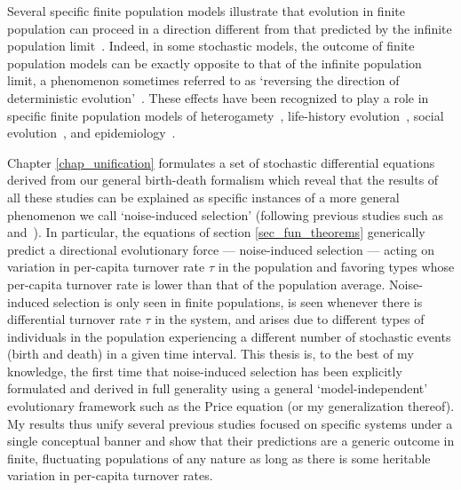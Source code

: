 Several specific finite population models illustrate that evolution in finite population can proceed in a direction different from that predicted by the infinite population limit~\citep{parsons_consequences_2010,melbinger_evolutionary_2010, houchmandzadeh_selection_2012, houchmandzadeh_fluctuation_2015,chotibut_evolutionary_2015,debarre_evolutionary_2016, behar_fluctuations-induced_2016, constable_demographic_2016,veller_drift-induced_2017,abu_awad_effects_2018,parsons_pathogen_2018,mcavoy_public_2018,mcleod_social_2019}. Indeed, in some stochastic models, the outcome of finite population models can be exactly opposite to that of the infinite population limit, a phenomenon sometimes referred to as `reversing the direction of deterministic evolution'~\citep{constable_demographic_2016,mcleod_social_2019, wang_reproductive_2023}. These effects have been recognized to play a role in specific finite population models of heterogamety~\citep{veller_drift-induced_2017,saunders_sex_2018}, life-history evolution~\citep{gillespie_natural_1974,kuosmanen_turnover_2022}, social evolution~\citep{houchmandzadeh_selection_2012,houchmandzadeh_fluctuation_2015,chotibut_evolutionary_2015,constable_demographic_2016,mcleod_social_2019,wang_reproductive_2023}, and epidemiology~\citep{kogan_two-strain_2014,parsons_pathogen_2018,day_price_2020}.

Chapter \ref{chap_unification} formulates a set of stochastic differential equations derived from our general birth-death formalism which reveal that the results of all these studies can be explained as specific instances of a more general phenomenon we call `noise-induced selection' (following previous studies such as~\cite{constable_demographic_2016} and~\cite{week_white_2021}). In particular, the equations of section \ref{sec_fun_theorems} generically predict a directional evolutionary force --- noise-induced selection --- acting on variation in per-capita turnover rate $\tau$ in the population and favoring types whose per-capita turnover rate is lower than that of the population average. Noise-induced selection is only seen in finite populations, is seen whenever there is differential turnover rate $\tau$ in the system, and arises due to different types of individuals in the population experiencing a different number of stochastic events (birth and death) in a given time interval. This thesis is, to the best of my knowledge, the first time that noise-induced selection has been explicitly formulated and derived in full generality using a general `model-independent' evolutionary framework such as the Price equation (or my generalization thereof). My results thus unify several previous studies focused on specific systems under a single conceptual banner and show that their predictions are a generic outcome in finite, fluctuating populations of any nature as long as there is some heritable variation in per-capita turnover rates.

